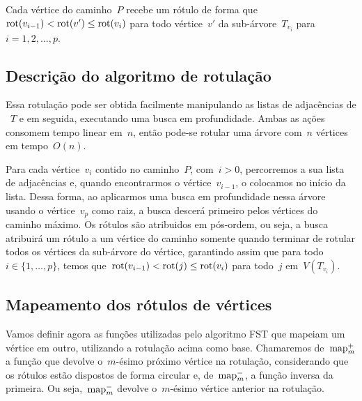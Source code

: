 	\bigskip

	Cada vértice do caminho~$P$ recebe 
	um rótulo de forma
		que~${\mathrm{rot}(v_{i-1})<\mathrm{rot}(v') \le \mathrm{rot}(v_i)}$ para todo 
		vértice~$v'$ da sub-árvore~$T_{v_i}$ para~$i=1,2,\ldots,p$. 

	\bigskip
	\bigskip

	\subsection{Descrição do algoritmo de rotulação}
	Essa rotulação pode ser obtida facilmente 
	manipulando as listas de adjacências de ~$T$ e em seguida,
	executando uma busca em profundidade.
	Ambas as ações consomem tempo linear em~$n$, então
	pode-se rotular uma árvore com~$n$ vértices em tempo~$O(n)$.

	Para cada vértice~$v_i$ contido no caminho~$P$, com~$i>0$,
	percorremos a sua lista de adjacências e, quando encontrarmos o 
	vértice~$v_{i-1}$, o colocamos no início da lista.
	Dessa forma, ao aplicarmos uma busca em profundidade nessa 
	árvore usando o vértice~$v_p$ como raiz, a busca descerá primeiro
	pelos vértices do caminho máximo.
	Os rótulos são atribuidos em pós-ordem, ou seja, a busca
	atribuirá um rótulo
	a um vértice do caminho
	somente quando terminar de rotular todos os vértices da sub-árvore
	do vértice, 
	garantindo assim que para todo~$i\in \{1,\ldots, p\}$, temos 
	que~$\mathrm{rot}(v_{i-1})<\mathrm{rot}(j)\le\mathrm{rot}(v_i)$ para todo~$j$ 
	em~$V(T_{v_i})$.
	
	\bigskip
	\bigskip
	\bigskip

	\subsection{Mapeamento dos rótulos de vértices }
	\label{sec:map}
	Vamos definir agora as funções
	utilizadas pelo algoritmo FST
	que mapeiam um vértice em 
	outro, utilizando a rotulação acima como base.
	Chamaremos de~${\mathrm{map}^+_m}$ a função que devolve o~$m$-ésimo 
	próximo vértice na rotulação, considerando que os rótulos
	estão dispostos de forma circular
	e, de~${\mathrm{map}^-_m}$, a função inversa da primeira. 
	Ou seja,~${\mathrm{map}^-_m}$ devolve o~$m$-ésimo vértice anterior
	na rotulação.


